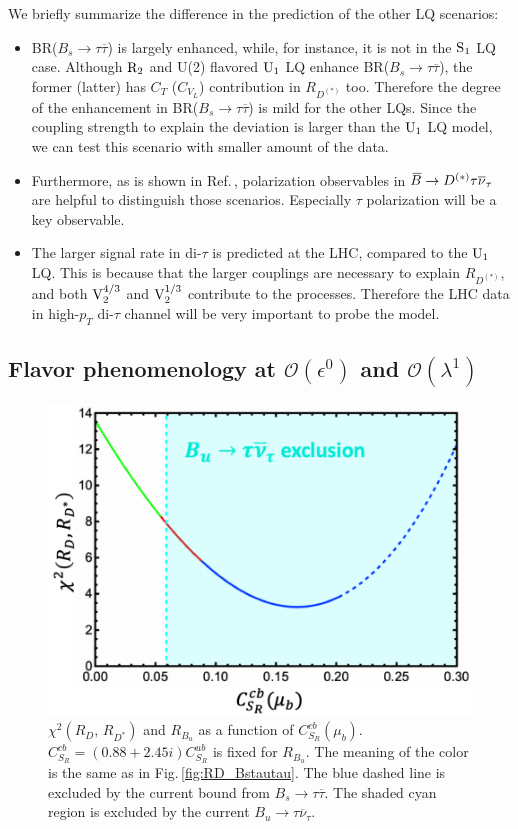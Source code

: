\documentclass[12pt, a4paper]{article}
\numberwithin{equation}{section} %
\newcommand{\ov}{\overline}
\newcommand{\1}{\mbox{1}\hspace{-0.25em}\mbox{l}}
\def\Bbar    {\kern 0.18em\overline{\kern -0.18em B}{}\xspace}
\def\Bb      {\ensuremath{\Bbar}\xspace}
\begin{document}
We briefly summarize the difference in the prediction of the other LQ scenarios:
\begin{itemize}
\item {BR($B_s\to\tau\ov\tau$) is largely enhanced, while, for instance, it is not in the $\rm{S}_1$ LQ case.
Although $\rm{R}_2$ and U(2) flavored $\rm{U}_1$ LQ enhance BR($B_s\to\tau\ov\tau$), the former (latter) has $C_T$ ($C_{V_L}$) contribution in $R_{D^{(*)}}$ too. 
Therefore the degree of the enhancement in BR($B_s\to\tau\ov\tau$) is mild for the other LQs.
Since the coupling strength to explain the deviation is larger than the $\rm{U}_1$ LQ model, we can test this scenario with smaller amount of the data.} 
\item {Furthermore, as is shown in Ref.\,\cite{Iguro:2018vqb}, polarization observables in $\Bb\to D^{(*)} \tau\ov\nu_\tau$ are helpful to distinguish those scenarios.
Especially $\tau$ polarization will be a key observable.}
\item {The larger signal rate in di-$\tau$ is predicted at the LHC, compared to the $\rm{U}_1$ LQ.
This is because that the larger couplings are necessary to explain $R_{D^{(*)}}$, and both $\rm{V}^{4/3}_2$ and $\rm{V}^{1/3}_2$ contribute to the processes.
Therefore the LHC data in high-$p_T$ di-$\tau$ channel will be very important to probe the model.}
\end{itemize}


\subsection{Flavor phenomenology at $\mathcal{O}(\epsilon^0)$ and $\mathcal{O}(\lambda^1)$ }
\label{sec:next_to_minimal_flavor}
\begin{figure}[t]
\begin{center}
 \includegraphics[width=0.5 \textwidth]{Figs/RDvsBtaunu.pdf}
\end{center}
 \caption{
$\chi^2(R_D,\,R_{D^{*}})$ and $R_{B_u}$ as a function of $C_{S_R}^{cb}(\mu_b)$.
$C_{S_R}^{cb}=(0.88+2.45i)C_{S_R}^{ub}$ is fixed for $R_{B_u}$. The meaning of the color is the same as in Fig.\,\ref{fig:RD_Bstautau}.
The blue dashed line is excluded by the current bound from $B_s\to\tau\ov\tau$.
The shaded cyan region is excluded by the current $B_u\to\tau\ov \nu_\tau$.
\label{fig:RD_Btaunu}
}
\end{figure}
\end{document}
